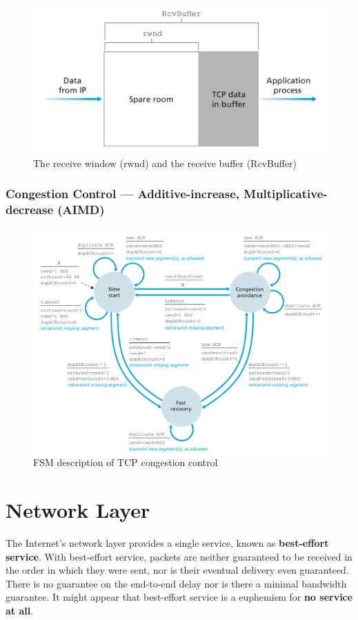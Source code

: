 \documentclass[11pt]{article}
\begin{document}
\begin{figure}[h]
	\centering
	\includegraphics[width=0.8\linewidth]{images/rwnd.png}
	\caption{The receive window (rwnd) and the receive buffer (RcvBuffer)}
	\label{fig:rwnd}
\end{figure}

\subsubsection{Congestion Control --- Additive-increase, Multiplicative-decrease (AIMD)}

\begin{figure}[h]
	\centering
	\includegraphics[width=0.9\linewidth]{images/CongestionControl.png}
	\caption{FSM description of TCP congestion control}
	\label{fig:CongestionControl}
\end{figure}

\section{Network Layer}

The Internet’s network layer provides a single service, known as \textbf{best-effort service}. With best-effort service, packets are neither guaranteed to be received in the order in which they were sent, nor is their eventual delivery even guaranteed. There is no guarantee on the end-to-end delay nor is there a minimal bandwidth guarantee. It might appear that best-effort service is a euphemism for \textbf{no service at all}.
\end{document}
